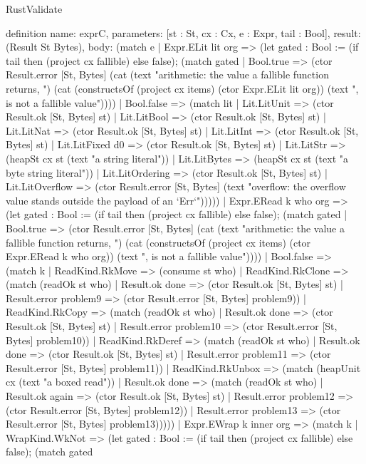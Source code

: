 \begin{lexlean}{RustValidate}
\begin{semanticmodule}
definition{
  name: exprC,
  parameters: [st : St, cx : Cx, e : Expr, tail : Bool],
  result: (Result St Bytes),
  body: (match e
    | Expr.ELit lit org => (let gated : Bool := (if tail then (project cx fallible) else false); (match gated
      | Bool.true => (ctor Result.error [St, Bytes] (cat (text "arithmetic: the value a fallible function returns, ") (cat (constructsOf (project cx items) (ctor Expr.ELit lit org)) (text ", is not a fallible value"))))
      | Bool.false => (match lit
        | Lit.LitUnit => (ctor Result.ok [St, Bytes] st)
        | Lit.LitBool => (ctor Result.ok [St, Bytes] st)
        | Lit.LitNat => (ctor Result.ok [St, Bytes] st)
        | Lit.LitInt => (ctor Result.ok [St, Bytes] st)
        | Lit.LitFixed d0 => (ctor Result.ok [St, Bytes] st)
        | Lit.LitStr => (heapSt cx st (text "a string literal"))
        | Lit.LitBytes => (heapSt cx st (text "a byte string literal"))
        | Lit.LitOrdering => (ctor Result.ok [St, Bytes] st)
        | Lit.LitOverflow => (ctor Result.error [St, Bytes] (text "overflow: the overflow value stands outside the payload of an `Err`")))))
    | Expr.ERead k who org => (let gated : Bool := (if tail then (project cx fallible) else false); (match gated
      | Bool.true => (ctor Result.error [St, Bytes] (cat (text "arithmetic: the value a fallible function returns, ") (cat (constructsOf (project cx items) (ctor Expr.ERead k who org)) (text ", is not a fallible value"))))
      | Bool.false => (match k
        | ReadKind.RkMove => (consume st who)
        | ReadKind.RkClone => (match (readOk st who)
          | Result.ok done => (ctor Result.ok [St, Bytes] st)
          | Result.error problem9 => (ctor Result.error [St, Bytes] problem9))
        | ReadKind.RkCopy => (match (readOk st who)
          | Result.ok done => (ctor Result.ok [St, Bytes] st)
          | Result.error problem10 => (ctor Result.error [St, Bytes] problem10))
        | ReadKind.RkDeref => (match (readOk st who)
          | Result.ok done => (ctor Result.ok [St, Bytes] st)
          | Result.error problem11 => (ctor Result.error [St, Bytes] problem11))
        | ReadKind.RkUnbox => (match (heapUnit cx (text "a boxed read"))
          | Result.ok done => (match (readOk st who)
            | Result.ok again => (ctor Result.ok [St, Bytes] st)
            | Result.error problem12 => (ctor Result.error [St, Bytes] problem12))
          | Result.error problem13 => (ctor Result.error [St, Bytes] problem13)))))
    | Expr.EWrap k inner org => (match k
      | WrapKind.WkNot => (let gated : Bool := (if tail then (project cx fallible) else false); (match gated
}
\end{semanticmodule}
\end{lexlean}
